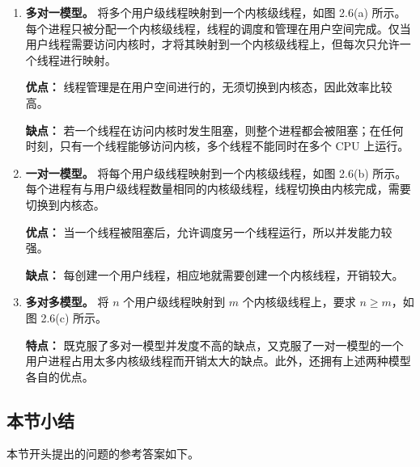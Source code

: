 \documentclass{ctexbook}
\begin{document}
	\begin{enumerate}
		\item \textbf{多对一模型。} 将多个用户级线程映射到一个内核级线程，如图 2.6(a) 所示。每个进程只被分配一个内核级线程，线程的调度和管理在用户空间完成。仅当用户线程需要访问内核时，才将其映射到一个内核级线程上，但每次只允许一个线程进行映射。
		
		
	\textbf{优点：} 线程管理是在用户空间进行的，无须切换到内核态，因此效率比较高。
		
	\textbf{缺点：} 若一个线程在访问内核时发生阻塞，则整个进程都会被阻塞；在任何时刻，只有一个线程能够访问内核，多个线程不能同时在多个 CPU 上运行。
		
		\item \textbf{一对一模型。} 将每个用户级线程映射到一个内核级线程，如图 2.6(b) 所示。每个进程有与用户级线程数量相同的内核级线程，线程切换由内核完成，需要切换到内核态。
		
		
	\textbf{优点：} 当一个线程被阻塞后，允许调度另一个线程运行，所以并发能力较强。
		
	\textbf{缺点：} 每创建一个用户线程，相应地就需要创建一个内核线程，开销较大。
		
		\item \textbf{多对多模型。} 将 $n$ 个用户级线程映射到 $m$ 个内核级线程上，要求 $n \geq m$，如图 2.6(c) 所示。
		
		
	\textbf{特点：} 既克服了多对一模型并发度不高的缺点，又克服了一对一模型的一个用户进程占用太多内核级线程而开销太大的缺点。此外，还拥有上述两种模型各自的优点。
		
	\end{enumerate}
	
	\subsection{本节小结}
	
	本节开头提出的问题的参考答案如下。
	
\end{document}
